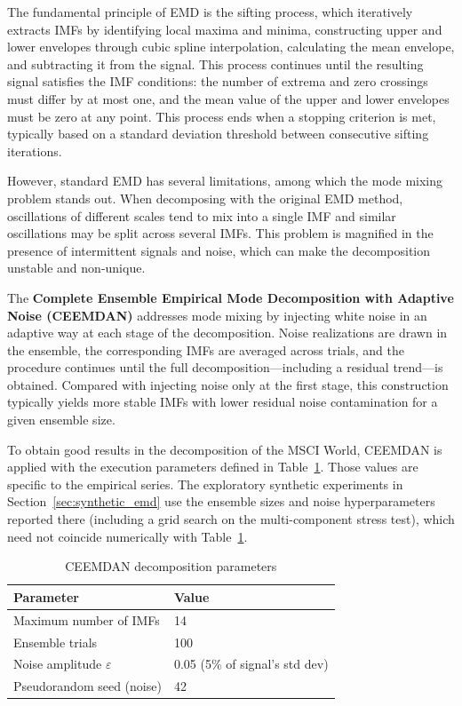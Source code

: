 \documentclass[11pt,a4paper]{article}
\begin{document}
The fundamental principle of EMD is the sifting process, which iteratively extracts IMFs by identifying local maxima and minima, constructing upper and lower envelopes through cubic spline interpolation, calculating the mean envelope, and subtracting it from the signal. This process continues until the resulting signal satisfies the IMF conditions: the number of extrema and zero crossings must differ by at most one, and the mean value of the upper and lower envelopes must be zero at any point. This process ends when a stopping criterion is met, typically based on a standard deviation threshold between consecutive sifting iterations.

However, standard EMD has several limitations, among which the mode mixing problem stands out. When decomposing with the original EMD method, oscillations of different scales tend to mix into a single IMF and similar oscillations may be split across several IMFs. This problem is magnified in the presence of intermittent signals and noise, which can make the decomposition unstable and non-unique.

The \textbf{Complete Ensemble Empirical Mode Decomposition with Adaptive Noise (CEEMDAN)} \citep{torres2011complete} addresses mode mixing by injecting white noise in an adaptive way at each stage of the decomposition. Noise realizations are drawn in the ensemble, the corresponding IMFs are averaged across trials, and the procedure continues until the full decomposition—including a residual trend—is obtained. Compared with injecting noise only at the first stage, this construction typically yields more stable IMFs with lower residual noise contamination for a given ensemble size.

To obtain good results in the decomposition of the MSCI World, CEEMDAN is applied with the execution parameters defined in Table~\ref{tab:ceemdan_params}. Those values are specific to the empirical series. The exploratory synthetic experiments in Section~\ref{sec:synthetic_emd} use the ensemble sizes and noise hyperparameters reported there (including a grid search on the multi-component stress test), which need not coincide numerically with Table~\ref{tab:ceemdan_params}.

\begin{table}[h]
\centering
\caption{CEEMDAN decomposition parameters}
\label{tab:ceemdan_params}
\begin{tabular}{ll}
\toprule
\textbf{Parameter} & \textbf{Value} \\
\midrule
Maximum number of IMFs & 14 \\
Ensemble trials & 100 \\
Noise amplitude $\varepsilon$ & 0.05 (5\% of signal's std dev) \\
Pseudorandom seed (noise) & 42 \\
\bottomrule
\end{tabular}
\end{table}
\end{document}
